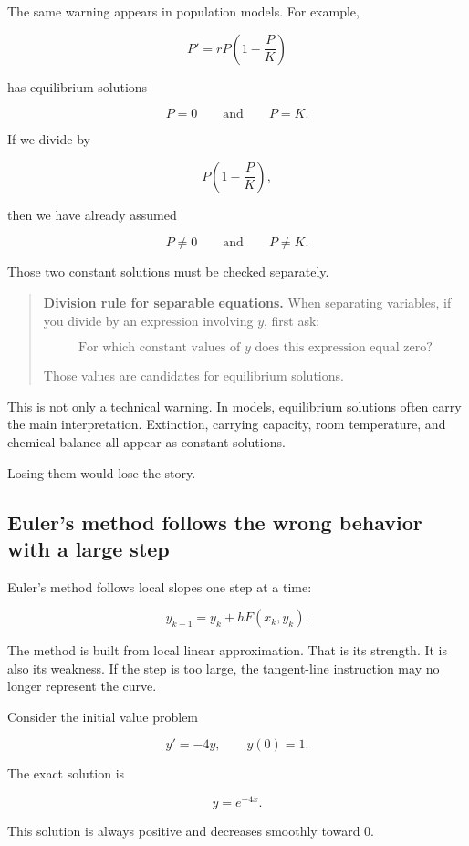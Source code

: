 The same warning appears in population models.  For example,

\[
P'=rP\left(1-\frac{P}{K}\right)
\]

has equilibrium solutions

\[
P=0
\qquad\text{and}\qquad
P=K.
\]

If we divide by

\[
P\left(1-\frac{P}{K}\right),
\]

then we have already assumed

\[
P\neq0
\qquad\text{and}\qquad
P\neq K.
\]

Those two constant solutions must be checked separately.

\begin{quote}
\textbf{Division rule for separable equations.}
When separating variables, if you divide by an expression involving \(y\), first ask:

\[
\text{For which constant values of \(y\) does this expression equal zero?}
\]

Those values are candidates for equilibrium solutions.
\end{quote}

This is not only a technical warning.  In models, equilibrium solutions often carry the
main interpretation.  Extinction, carrying capacity, room temperature, and chemical
balance all appear as constant solutions.

Losing them would lose the story.

\subsection{Euler's method follows the wrong behavior with a large step}
\label{subsec:euler-wrong-behavior-large-step}

Euler's method follows local slopes one step at a time:

\[
y_{k+1}=y_k+hF(x_k,y_k).
\]

The method is built from local linear approximation.  That is its strength.  It is also its
weakness.  If the step is too large, the tangent-line instruction may no longer represent
the curve.

Consider the initial value problem

\[
y'=-4y,
\qquad
y(0)=1.
\]

The exact solution is

\[
\boxed{
y=e^{-4x}.
}
\]

This solution is always positive and decreases smoothly toward \(0\).

